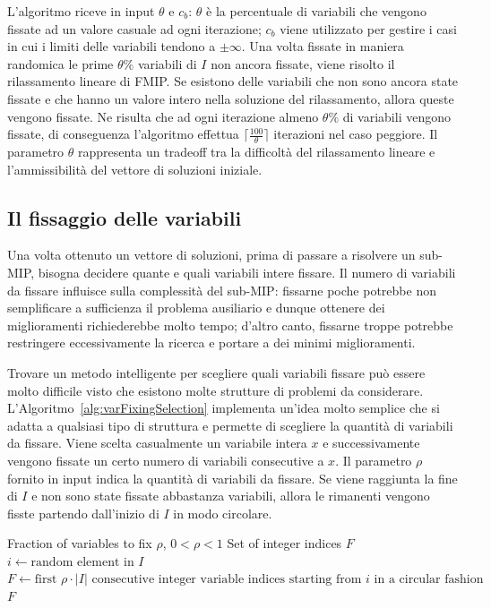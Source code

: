 L'algoritmo riceve in input $\theta$ e $c_b$: $\theta$ è la percentuale
di variabili che vengono fissate ad un valore casuale ad ogni iterazione;
$c_b$ viene utilizzato per gestire i casi in cui i limiti delle variabili
tendono a $\pm \infty$.
Una volta fissate in maniera randomica le prime $\theta\%$ variabili
di $I$ non ancora fissate, viene risolto il rilassamento lineare di FMIP.
Se esistono delle variabili che non sono ancora state fissate e che hanno un
valore intero nella soluzione del rilassamento, allora queste vengono fissate.
Ne risulta che ad ogni iterazione almeno $\theta\%$ di variabili vengono
fissate,
di conseguenza l'algoritmo effettua $\lceil \frac{100}{\theta}\rceil$ iterazioni
nel caso peggiore.
Il parametro $\theta$ rappresenta un tradeoff tra la difficoltà del rilassamento
lineare e l'ammissibilità del vettore di soluzioni iniziale.

\subsection{Il fissaggio delle variabili}%
\label{sub:Il fissaggio delle variabili}
Una volta ottenuto un vettore di soluzioni, prima di passare a risolvere un
sub-MIP, bisogna decidere quante e quali variabili intere fissare.
Il numero di variabili da fissare influisce sulla complessità del sub-MIP:
fissarne poche potrebbe non semplificare a sufficienza il problema
ausiliario e dunque ottenere dei miglioramenti richiederebbe molto tempo;
d'altro canto, fissarne troppe potrebbe restringere eccessivamente la ricerca
e portare a dei minimi miglioramenti.

Trovare un metodo intelligente per scegliere quali variabili fissare può essere
molto difficile visto che esistono molte strutture di problemi da considerare.
L'Algoritmo~\ref{alg:varFixingSelection} implementa un'idea molto semplice
che si adatta a qualsiasi tipo di struttura e permette di scegliere la quantità
di variabili da fissare.
Viene scelta casualmente un variabile intera $x$ e successivamente vengono fissate 
un certo numero di variabili consecutive a $x$.
Il parametro $\rho$ fornito in input indica la quantità di variabili
da fissare.
Se viene raggiunta la fine di $I$ e non sono state fissate abbastanza variabili,
allora le rimanenti vengono fisste partendo dall'inizio di $I$ in modo circolare.

\begin{algorithm} 
    \caption{Selezione delle variabili da fissare} \label{alg:varFixingSelection}
    \begin{algorithmic}
        \Require Fraction of variables to fix $\rho$, $0 < \rho < 1$
        \Ensure Set of integer indices $F$
        \State $i \gets \text{random element in $I$}$
        \State $F \gets \text{first $\rho \cdot |I|$ consecutive integer variable indices starting from $i$ in a circular fashion}$
        \State \Return $F$
        \EndFunction
    \end{algorithmic}
\end{algorithm}

